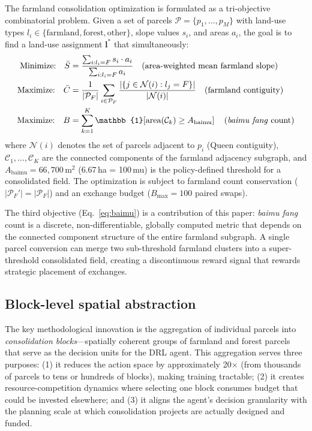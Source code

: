 \documentclass[preprint,12pt]{elsarticle}
\begin{document}
The farmland consolidation optimization is formulated as a tri-objective combinatorial problem. Given a set of parcels $\mathcal{P} = \{p_1, \ldots, p_M\}$ with land-use types $l_i \in \{\text{farmland}, \text{forest}, \text{other}\}$, slope values $s_i$, and areas $a_i$, the goal is to find a land-use assignment $\mathbf{l}^*$ that simultaneously:
\begin{align}
\text{Minimize:} \quad \bar{S} &= \frac{\sum_{i: l_i = F} s_i \cdot a_i}{\sum_{i: l_i = F} a_i} \quad \text{(area-weighted mean farmland slope)} \label{eq:slope} \\
\text{Maximize:} \quad \bar{C} &= \frac{1}{|\mathcal{P}_F|} \sum_{i \in \mathcal{P}_F} \frac{|\{j \in \mathcal{N}(i): l_j = F\}|}{|\mathcal{N}(i)|} \quad \text{(farmland contiguity)} \label{eq:cont} \\
\text{Maximize:} \quad B &= \sum_{k=1}^{K} \mathbb{1}\!\left[\text{area}(\mathcal{C}_k) \geq A_{\text{baimu}}\right] \quad \text{(\textit{baimu fang} count)} \label{eq:baimu}
\end{align}
where $\mathcal{N}(i)$ denotes the set of parcels adjacent to $p_i$ (Queen contiguity), $\mathcal{C}_1, \ldots, \mathcal{C}_K$ are the connected components of the farmland adjacency subgraph, and $A_{\text{baimu}} = 66{,}700$\,m$^2$ (6.67\,ha = 100\,mu) is the policy-defined threshold for a consolidated field. The optimization is subject to farmland count conservation ($|\mathcal{P}_F'| = |\mathcal{P}_F|$) and an exchange budget ($B_{\max} = 100$ paired swaps).

The third objective (Eq.~\ref{eq:baimu}) is a contribution of this paper: \textit{baimu fang} count is a discrete, non-differentiable, globally computed metric that depends on the connected component structure of the entire farmland subgraph. A single parcel conversion can merge two sub-threshold farmland clusters into a super-threshold consolidated field, creating a discontinuous reward signal that rewards strategic placement of exchanges.

\subsection{Block-level spatial abstraction}
\label{sec:blocks}

The key methodological innovation is the aggregation of individual parcels into \textit{consolidation blocks}---spatially coherent groups of farmland and forest parcels that serve as the decision units for the DRL agent. This aggregation serves three purposes: (1) it reduces the action space by approximately 20$\times$ (from thousands of parcels to tens or hundreds of blocks), making training tractable; (2) it creates resource-competition dynamics where selecting one block consumes budget that could be invested elsewhere; and (3) it aligns the agent's decision granularity with the planning scale at which consolidation projects are actually designed and funded.
\end{document}

